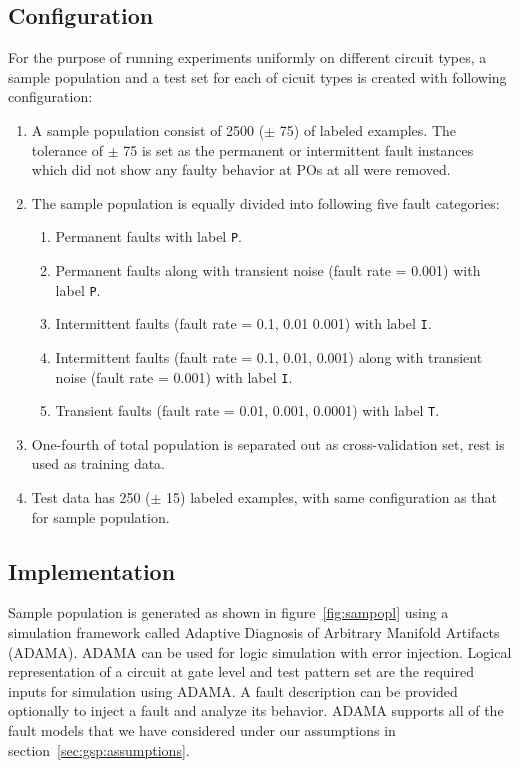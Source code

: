 \subsection{Configuration}
For the purpose of running experiments uniformly on different circuit types, a sample population and a test set for each of cicuit types is created with following configuration:
\begin{enumerate}
  \item A sample population consist of 2500 ($\pm$ 75) of labeled examples. The tolerance of $\pm$ 75 is set as the permanent or intermittent fault instances which did not show any faulty behavior at POs at all were removed.
  \item The sample population is equally divided into following five fault categories:
		\begin{enumerate}
    		\item Permanent faults with label \texttt{P}.
    		\item Permanent faults along with transient noise (fault rate = 0.001) with label \texttt{P}.
			\item Intermittent faults (fault rate = 0.1, 0.01 0.001) with label \texttt{I}.
    		\item Intermittent faults (fault rate = 0.1, 0.01, 0.001) along with transient noise (fault rate = 0.001) with label \texttt{I}.
			\item Transient faults (fault rate = 0.01, 0.001, 0.0001) with label \texttt{T}.
 		 \end{enumerate}
  \item One-fourth of total population is separated out as cross-validation set, rest is used as training data.
  \item Test data has 250 ($\pm$ 15) labeled examples, with same configuration as that for sample population.
\end{enumerate}

\subsection{Implementation}

Sample population is generated as shown in figure~\ref{fig:sampopl} using a simulation framework called Adaptive Diagnosis of Arbitrary Manifold Artifacts (ADAMA). ADAMA can be used for logic simulation with error injection. Logical representation of a circuit at gate level and test pattern set are the required inputs for simulation using ADAMA. A fault description can be provided optionally to inject a fault and analyze its behavior. ADAMA supports all of the fault models that we have considered under our assumptions in section~\ref{sec:gsp:assumptions}.

